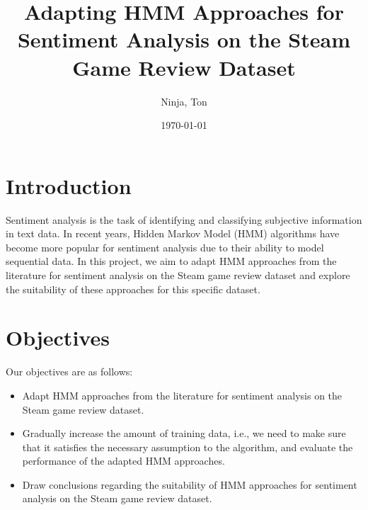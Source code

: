 \documentclass{article}
\title{Adapting HMM Approaches for Sentiment Analysis on the Steam Game Review Dataset}
\author{Ninja, Ton}
\date{\today}
\begin{document}
\maketitle

\section{Introduction}
Sentiment analysis is the task of identifying and classifying subjective information in text data. In recent years, Hidden Markov Model (HMM) algorithms have become more popular for sentiment analysis due to their ability to model sequential data. In this project, we aim to adapt HMM approaches from the literature for sentiment analysis on the Steam game review dataset and explore the suitability of these approaches for this specific dataset.

\section{Objectives}
Our objectives are as follows:
\begin{itemize}
\item Adapt HMM approaches from the literature for sentiment analysis on the Steam game review dataset.
\item Gradually increase the amount of training data, i.e., we need to make sure that it satisfies the necessary assumption to the algorithm, and evaluate the performance of the adapted HMM approaches.
\item Draw conclusions regarding the suitability of HMM approaches for sentiment analysis on the Steam game review dataset.
\end{itemize}
\end{document}

